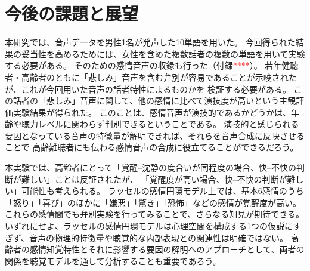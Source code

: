 

%




\section{今後の課題と展望}
\label{sec:Challenges}
本研究では、音声データを男性1名が発声した10単語を用いた。
今回得られた結果の妥当性を高めるためには、女性を含めた複数話者の複数の単語を用いて実験する必要がある。
そのための感情音声の収録も行った（付録\textcolor{red}{****}）。
若年健聴者・高齢者のともに「悲しみ」音声を含む弁別が容易であることが示唆されたが、これが今回用いた音声の話者特性によるものかを
検証する必要がある。
この話者の「悲しみ」音声に関して、他の感情に比べて演技度が高いという主観評価実験結果が得られた。
このことは、感情音声が演技的であるかどうかは、年齢や聴力レベルに関わらず判別できるということである。
演技的と感じられる要因となっている音声の特徴量が解明できれば、それらを音声合成に反映させることで
高齢難聴者にも伝わる感情音声の合成に役立てることができるだろう。

本実験では、高齢者にとって「覚醒–沈静の度合いが同程度の場合、快–不快の判断が難しい」ことは反証されたが、
「覚醒度が高い場合、快–不快の判断が難しい」可能性も考えられる。
ラッセルの感情円環モデル上では、基本6感情のうち「怒り」「喜び」のほかに「嫌悪」「驚き」「恐怖」などの感情が覚醒度が高い。
これらの感情間でも弁別実験を行ってみることで、さらなる知見が期待できる。
いずれにせよ、ラッセルの感情円環モデルは心理空間を構成する1つの仮説にすぎず、音声の物理的特徴量や聴覚的な内部表現との関連性は明確ではない。
高齢者の感情知覚特性とそれに影響する要因の解明へのアプローチとして、両者の関係を聴覚モデルを通して分析することも重要であろう。




